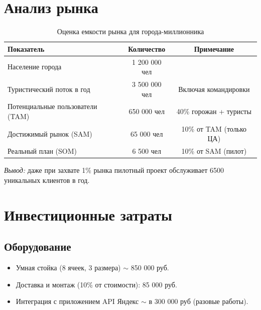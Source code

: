 \documentclass[12pt,a4paper]{article}
\begin{document}
\section{Анализ рынка}
\begin{table}[H]
\centering
\caption{Оценка емкости рынка для города-миллионника}
\begin{tabular}{@{}lcc@{}}
\toprule
Показатель & Количество & Примечание \\
\midrule
Население города & 1 200 000 чел & \\
Туристический поток в год & 3 500 000 чел & Включая командировки \\
Потенциальные пользователи (TAM) & 650 000 чел & 40\% горожан + туристы \\
Достижимый рынок (SAM) & 65 000 чел & 10\% от TAM (только ЦА) \\
Реальный план (SOM) & 6 500 чел & 10\% от SAM (пилот) \\
\bottomrule
\end{tabular}
\end{table}

\textit{Вывод:} даже при захвате 1\% рынка пилотный проект обслуживает 6500 уникальных клиентов в год.


\section{Инвестиционные затраты}
\subsection{Оборудование}
\begin{itemize}
    \item Умная стойка (8 ячеек, 3 размера) $\sim$ 850 000 руб.
    \item Доставка и монтаж (10\% от стоимости): 85 000 руб.
    \item Интеграция с приложением API Яндекс $\sim$ в 300 000 руб (разовые работы).
\end{itemize}
\end{document}
